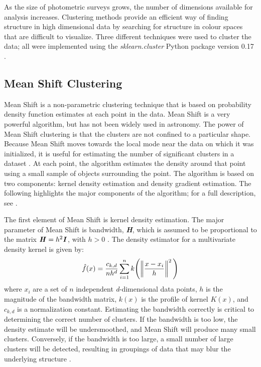 As the size of photometric surveys grows, the number of dimensions available for analysis increases.
Clustering methods provide an efficient way of finding structure in high dimensional data by searching for structure in colour spaces that are difficult to visualize. 
Three different techniques were used to cluster the data;
all were implemented using the \textit{sklearn.cluster} Python package version 0.17 \citep{sklearn}. %

\subsection{Mean Shift Clustering}
\label{sec:methods_ms}

Mean Shift is a non-parametric clustering technique that is based on probability density function estimates at each point in the data. 
Mean Shift is a very powerful algorithm, but has not been widely used in astronomy. %
The power of Mean Shift clustering is that the clusters are not confined to a particular shape.
Because Mean Shift moves towards the local mode near the data on which it was initialized, it is useful for estimating the number of significant clusters in a dataset \citep{comanciciu02}.
At each point, the algorithm estimates the density around that point using a small sample of objects surrounding the point.
The algorithm is based on two components: kernel density estimation and density gradient estimation.
The following highlights the major components of the algorithm; for a full description, see \citet{vatturi09}.

The first element of Mean Shift is kernel density estimation. 
The major parameter of Mean Shift is bandwidth, \textbf{\textit{H}}, which is assumed to be proportional to the matrix $\textbf{\textit{H}} = h^2\textbf{\textit{I}}$, with $h>0$ \citet{vatturi09}.
The density estimator for a multivariate density kernel is given by: 
\begin{equation} 
\label{eq:ms_de}
\hat{f}(x) = \frac{c_{k,d}}{nh^d} \sum_{i=1}^n k\Bigg( \norm{\frac{x-x_{i}}{h}}^2 \Bigg)
\end{equation}
where $x_i$ are a set of $n$ independent \textit{d}-dimensional data points, $h$ is the magnitude of the bandwidth matrix, $k(x)$ is the profile of kernel $K(x)$, and $c_{k,d}$ is a normalization constant. %
Estimating the bandwidth correctly is critical to determining the correct number of clusters.
If the bandwidth is too low, the density estimate will be undersmoothed, and Mean Shift will produce many small clusters.
Conversely, if the bandwidth is too large, a small number of large clusters will be detected, resulting in groupings of data that may blur the underlying structure \citet{vatturi09}.

